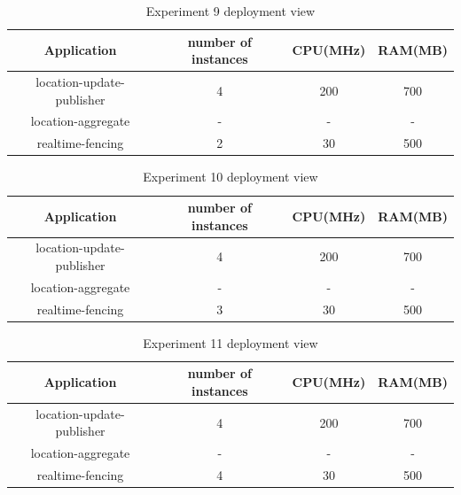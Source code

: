 \documentclass[a4]{report}
\begin{document}
    \begin{table}[h!]
        \centering
        \begin{tabular}{|c|c|c|c|}
            \hline
            Application               & number of instances & CPU(MHz) & RAM(MB) \\
            \hline
            location-update-publisher & 4                   & 200      & 700     \\
            location-aggregate        & -                   & -        & -       \\
            realtime-fencing          & 2                   & 30       & 500     \\
            \hline
        \end{tabular}
        \caption{Experiment 9 deployment view}
        \label{table:ex9-dv}
    \end{table}

    \begin{table}[h!]
        \centering
        \begin{tabular}{|c|c|c|c|}
            \hline
            Application               & number of instances & CPU(MHz) & RAM(MB) \\
            \hline
            location-update-publisher & 4                   & 200      & 700     \\
            location-aggregate        & -                   & -        & -       \\
            realtime-fencing          & 3                   & 30       & 500     \\
            \hline
        \end{tabular}
        \caption{Experiment 10 deployment view}
        \label{table:ex10-dv}
    \end{table}

    \begin{table}[h!]
        \centering
        \begin{tabular}{|c|c|c|c|}
            \hline
            Application               & number of instances & CPU(MHz) & RAM(MB) \\
            \hline
            location-update-publisher & 4                   & 200      & 700     \\
            location-aggregate        & -                   & -        & -       \\
            realtime-fencing          & 4                   & 30       & 500     \\
            \hline
        \end{tabular}
        \caption{Experiment 11 deployment view}
        \label{table:ex11-dv}
    \end{table}
\end{document}
